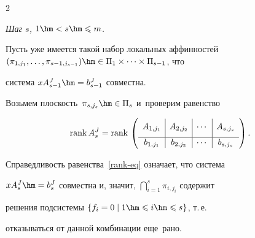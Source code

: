 \begin{multicols}{2}











\textit{Шаг $s$, $1\hm<s\hm\leqslant m$.}


Пусть уже имеется такой набор локальных аффинностей $(\pi_{1,j_1},\ldots,


\pi_{s-1,j_{s-1}})\hm\in\Pi_1\times\cdots\times\Pi_{s-1}$, что


 система $xA^{J}_{s-1}\hm=b^{J}_{s-1}$ совместна.


Возьмем плоскость~$\pi_{s,j_s}\hm\in\Pi_s$ и~проверим равенство


\begin{equation}


\label{rank-eq}


  \rank A^{J}_s =








  \rank \left(\begin{array}{c|c|c|c}


                \rule{0pt}{1.2em} A_{1,j_1} & A_{2,j_2} & \cdots & 


A_{s,j_s}\\[6pt]


                \hline


                b_{1,j_1} & b_{2,j_2} & \cdots & b_{s,j_s}


              \end{array}\right).


\end{equation}


Справедливость равенства~\eqref{rank-eq} означает, что система 


$xA^{J}_s\hm=b^{J}_s$ совместна и, значит, $\bigcap_{i=1}^s \pi_{i,j_i}$ содержит 


решения подсистемы $\{f_i=0\mid 1\hm\leqslant i\hm\leqslant s\}$, т.\,е.\


 отказываться от данной комбинации еще~рано.






\end{multicols}
